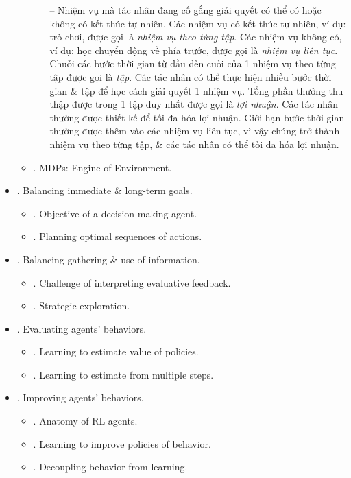 \documentclass{article}
\begin{document}
\begin{itemize}
\begin{itemize}
\begin{itemize}
            -- Nhiệm vụ mà tác nhân đang cố gắng giải quyết có thể có hoặc không có kết thúc tự nhiên. Các nhiệm vụ có kết thúc tự nhiên, ví dụ: trò chơi, được gọi là {\it nhiệm vụ theo từng tập}. Các nhiệm vụ không có, ví dụ: học chuyển động về phía trước, được gọi là {\it nhiệm vụ liên tục}. Chuỗi các bước thời gian từ đầu đến cuối của 1 nhiệm vụ theo từng tập được gọi là {\it tập}. Các tác nhân có thể thực hiện nhiều bước thời gian \& tập để học cách giải quyết 1 nhiệm vụ. Tổng phần thưởng thu thập được trong 1 tập duy nhất được gọi là {\it lợi nhuận}. Các tác nhân thường được thiết kế để tối đa hóa lợi nhuận. Giới hạn bước thời gian thường được thêm vào các nhiệm vụ liên tục, vì vậy chúng trở thành nhiệm vụ theo từng tập, \& các tác nhân có thể tối đa hóa lợi nhuận.
        \end{itemize}
        \item {. MDPs: Engine of Environment.}
    \end{itemize}
    \item {. Balancing immediate \& long-term goals.}
    \begin{itemize}
        \item {. Objective of a decision-making agent.}
        \item {. Planning optimal sequences of actions.}
    \end{itemize}
    \item {. Balancing gathering \& use of information.}
    \begin{itemize}
        \item {. Challenge of interpreting evaluative feedback.}
        \item {. Strategic exploration.}
    \end{itemize}
    \item {. Evaluating agents' behaviors.}
    \begin{itemize}
        \item {. Learning to estimate value of policies.}
        \item {. Learning to estimate from multiple steps.}
    \end{itemize}
    \item {. Improving agents' behaviors.}
    \begin{itemize}
        \item {. Anatomy of RL agents.}
        \item {. Learning to improve policies of behavior.}
        \item {. Decoupling behavior from learning.}

\end{itemize}
\end{itemize}
\end{document}
